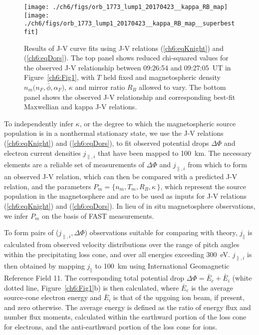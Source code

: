   \begin{figure}
    \centering
    \noindent\texttt{[image: ./ch6/figs/orb\_1773\_lump1\_20170423\_\_kappa\_RB\_map]}
    \noindent\texttt{[image: ./ch6/figs/orb\_1773\_lump1\_20170423\_\_kappa\_RB\_map\_\_superbestfit]}
    \caption[Orbit 1773: Reduced chi-squared values for observed J-V curves with
    $T$ held fixed and magnetospheric density $n_m \big ( n_F, \bar{\phi},
    \alpha_F \big )$ $\kappa$ and $R_B$ allowed to vary, and corresponding
    best-fit J-V curves.]{Results of J-V curve fits using J-V relations
      (\ref{ch6:eqKnight}) and (\ref{ch6:eqDors}). The top panel shows reduced
      chi-squared values for the observed J-V relationship between 09:26:54 and
      09:27:05~UT in Figure~\ref{ch6:Fig1}, with $T$ held fixed and
      magnetospheric density $n_m \big ( n_F, \bar{\phi}, \alpha_F \big )$,
      $\kappa$ and mirror ratio $R_B$ allowed to vary. The bottom panel shows
      the observed J-V relationship and corresponding best-fit Maxwellian and
      kappa J-V relations.}
    \label{ch6:Fig3}
  \end{figure}


  To independently infer $\kappa$, or the degree to which the magnetospheric
  source population is in a nonthermal stationary state, we use the J-V
  relations (\ref{ch6:eqKnight}) and (\ref{ch6:eqDors}), to fit observed
  potential drops $\Delta \Phi$ and electron current densities $j_{\parallel,i}$
  that have been mapped to 100~km. The necessary elements are a reliable set of
  measurements of $\Delta \Phi$ and $j_{\parallel,i}$ from which to form an
  observed J-V relation, which can then be compared with a predicted J-V
  relation, and the parameters $P_m = \{ n_m, T_m, R_B, \kappa \, \}$, which
  represent the source population in the magnetosphere and are to be used as
  inputs for J-V relations (\ref{ch6:eqKnight}) and (\ref{ch6:eqDors}). In lieu
  of in situ magnetosphere observations, we infer $P_m$ on the basis of FAST
  measurements.

  To form pairs of ($j_{\parallel,i}, \Delta \Phi$) observations suitable for
  comparing with theory, $j_\parallel$ is calculated from observed velocity
  distributions over the range of pitch angles within the precipitating loss
  cone, and over all energies exceeding 300~eV.  $j_{\parallel,i}$ is then
  obtained by mapping $j_\parallel$ to 100~km using International Geomagnetic
  Reference Field 11. The corresponding total potential drop $\Delta \Phi =
  \bar{E}_e + \bar{E}_i$ (white dotted line, Figure~\ref{ch6:Fig1}b) is then
  calculated, where $\bar{E}_e$ is the average source-cone electron energy and
  $\bar{E}_i$ is that of the upgoing ion beam, if present, and zero
  otherwise. The average energy is defined as the ratio of energy flux and
  number flux moments, calculated within the earthward portion of the loss cone
  for electrons, and the anti-earthward portion of the loss cone for ions.

